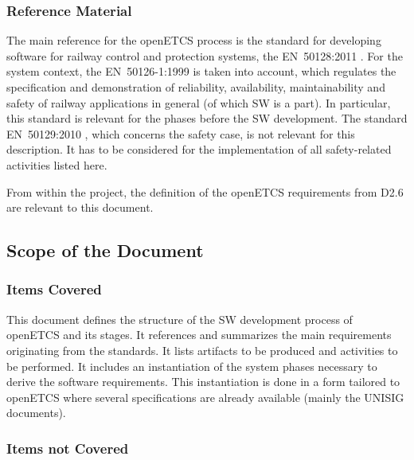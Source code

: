\documentclass{template/openetcs_article}
\begin{document}
\subsubsection{Reference Material}
\label{sec:reference-material}

The main reference for the openETCS process is the standard for
developing software for railway control and protection systems, the
EN~50128:2011 \cite{EN50128:2011}. For the system context, the
EN~50126-1:1999 \cite{EN50126:1999} is taken into account, which
regulates the specification and demonstration of reliability,
availability, maintainability and safety of railway applications in
general (of which SW is a part). In particular, this standard is
relevant for the phases before the SW development. The standard
EN~50129:2010 \cite{EN50129:2010}, which concerns the safety case, is
not relevant for this description. It has to be considered for the
implementation of all safety-related activities listed here.


From within the project, the definition of the openETCS requirements from
D2.6 \citep{openETCS:D2.6} are relevant to this document.

\subsection{Scope of the Document}
\label{sec:scope-document}

\subsubsection{Items Covered}
\label{sec:items-covered}

This document defines the structure of the SW development process of
openETCS and its stages. It references and summarizes the main
requirements originating from the standards. It lists artifacts to be
produced and activities to be performed. It includes an instantiation
of the system phases necessary to derive the software
requirements. This instantiation is done in a form tailored to
openETCS where several specifications are already available (mainly
the UNISIG documents). 


\subsubsection{Items not Covered}
\label{sec:items-not-covered}
\end{document}
